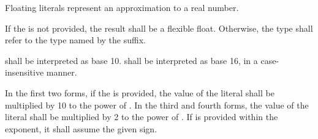 \begin{grammar}
 \exactly \\
	   \\

 \exactly \\
	   \\

 \oneof \\
        \terminal{+}
        \terminal{-} \\

 \oneof \\
         \\

 \oneof \\
         \\
\end{grammar}

Floating literals represent an approximation to a real number.

\specsubitem
If the  is not provided, the result shall be a
flexible float. Otherwise, the type shall refer to the type named by the suffix.

\specsubitem
{} shall be interpreted as base 10.
 shall be interpreted as base 16, in a case-insensitive
manner.

\specsubitem
In the first two forms, if the  is provided, the
value of the literal shall be multiplied by 10 to the power of
. In the third and fourth forms, the value of the
literal shall be multiplied by 2 to the power of .
If  is provided within the exponent, it shall assume the given
sign.



